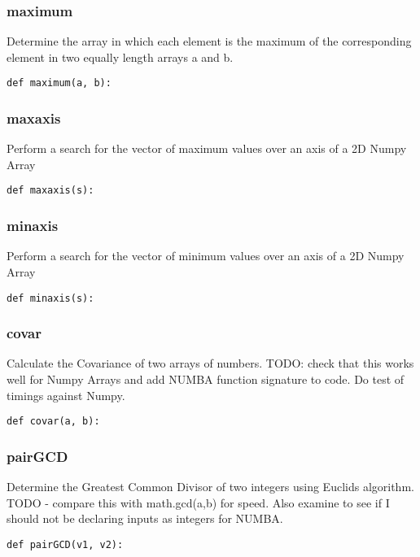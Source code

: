 \documentclass[twoside,11pt]{book}
\begin{document}
\subsubsection*{{\bf maximum}}
Determine the array in which each element is the maximum of the corresponding element in two equally length arrays a and b.  

\begin{lstlisting}
def maximum(a, b):
\end{lstlisting}

\subsubsection*{{\bf maxaxis}}
Perform a search for the vector of maximum values over an axis of a 2D Numpy Array  

\begin{lstlisting}
def maxaxis(s):
\end{lstlisting}

\subsubsection*{{\bf minaxis}}
Perform a search for the vector of minimum values over an axis of a 2D Numpy Array  

\begin{lstlisting}
def minaxis(s):
\end{lstlisting}

\subsubsection*{{\bf covar}}
Calculate the Covariance of two arrays of numbers. TODO: check that this works well for Numpy Arrays and add NUMBA function signature to code. Do test of timings against Numpy.  

\begin{lstlisting}
def covar(a, b):
\end{lstlisting}

\subsubsection*{{\bf pairGCD}}
Determine the Greatest Common Divisor of two integers using Euclids algorithm. TODO - compare this with math.gcd(a,b) for speed. Also examine to see if I should not be declaring inputs as integers for NUMBA.  

\begin{lstlisting}
def pairGCD(v1, v2):
\end{lstlisting}
\end{document}
